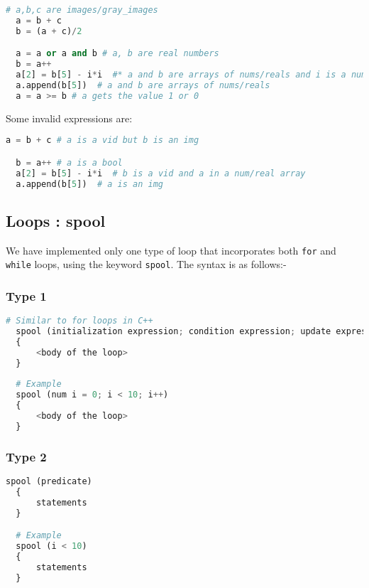 \documentclass[a4paper, 11pt]{article}
\begin{document}
    \begin{lstlisting}[language=Python]
  # a,b,c are images/gray_images
  a = b + c
  b = (a + c)/2

  a = a or a and b # a, b are real numbers
  b = a++
  a[2] = b[5] - i*i  #* a and b are arrays of nums/reals and i is a num/real. This also works with videos *#
  a.append(b[5])  # a and b are arrays of nums/reals
  a = a >= b # a gets the value 1 or 0\end{lstlisting}

    Some invalid expressions are:

  \begin{lstlisting}[language=Python]
  a = b + c # a is a vid but b is an img

  b = a++ # a is a bool
  a[2] = b[5] - i*i  # b is a vid and a in a num/real array
  a.append(b[5])  # a is an img\end{lstlisting}
  
    \subsection{Loops : spool}

    We have implemented only one type of loop that incorporates both \texttt{for} and \texttt{while} loops, using the keyword \texttt{spool}. The syntax is as follows:-
    \subsubsection*{Type 1}

    
      \begin{lstlisting}[language=Python]
  # Similar to for loops in C++
  spool (initialization expression; condition expression; update expression)
  {
      <body of the loop>
  }
  
  # Example
  spool (num i = 0; i < 10; i++)
  {
      <body of the loop>
  }\end{lstlisting}

      \subsubsection*{Type 2}

      
      \begin{lstlisting}[language=Python]
  spool (predicate) 
  {
      statements
  }

  # Example
  spool (i < 10)
  {
      statements
  }\end{lstlisting}  
\end{document}

